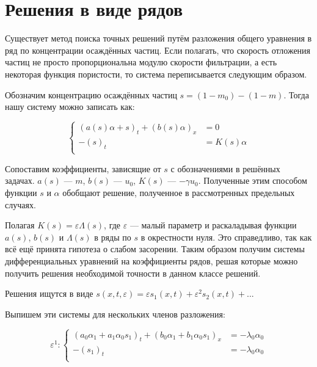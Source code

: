\section{Решения в виде рядов}
\par Существует метод поиска точных решений путём разложения общего уравнения в ряд по концентрации осаждённых частиц. Если полагать, что скорость отложения частиц не просто пропорциональна  модулю скорости фильтрации, а есть некоторая функция пористости, то система переписывается следующим образом.

\par Обозначим концентрацию осаждённых частиц $s = (1-m_{0})-(1-m)$. Тогда нашу систему можно записать как:

\begin{equation*}
\begin{cases}
(a(s)\alpha+s)_{t}+(b(s)\alpha)_{x}&= 0\\
-(s)_{t}&=K(s)\alpha\\
\end{cases}
\end{equation*}

\par Сопоставим коэффициенты, зависящие от $s$ с обозначениями в решённых задачах. $a(s)$ --- $m$, $b(s)$ --- $u_{0}$, $K(s)$ --- $-\gamma u_{0}$. Полученные этим способом функции $s$ и $\alpha$ обобщают решение, полученное в рассмотренных предельных случаях. 

\par Полагая $K(s)=\varepsilon\Lambda(s)$, где $\varepsilon$ --- малый параметр и раскаладывая функции $a(s)$, $b(s)$ и $\Lambda(s)$ в ряды по $s$ в окрестности нуля. Это справедливо, так как всё ещё принята гипотеза о слабом засорении. Таким образом получим системы дифференциальных уравнений на коэффициенты рядов, решая которые можно получить решения необходимой точности в данном классе решений.
\par Решения ищутся в виде $s(x,t,\varepsilon)=\varepsilon s_{1}(x,t)+\varepsilon^{2} s_{2}(x,t)+...$
\par Выпишем эти системы для нескольких членов разложения:

\begin{equation*}
\varepsilon^{1}: 
\begin{cases}
(a_{0}\alpha_{1}+a_{1}\alpha_{0}s_{1})_{t}+(b_{0}\alpha_{1}+b_{1}\alpha_{0} s_{1})_{x}&= -\lambda_{0} \alpha_{0}\\
-(s_{1})_{t}&= - \lambda_{0} \alpha_{0}\\
\end{cases}
\end{equation*}

